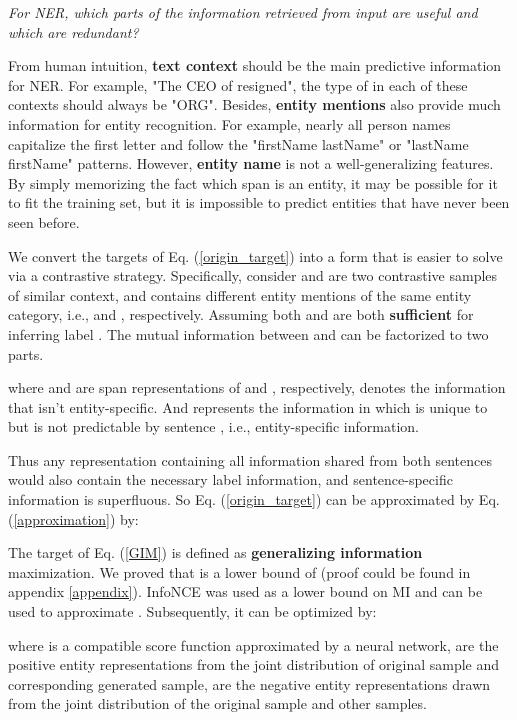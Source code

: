 \documentclass[11pt]{article}
\begin{document}
\textit{For NER, which parts of the information retrieved from input  are useful and which are redundant?}

From human intuition, \textbf{text context} should be the main predictive information for NER. For example, "The CEO of  resigned", the type of  in each of these contexts should always be "ORG". Besides, \textbf{entity mentions} also provide much information for entity recognition. For example, nearly all person names capitalize the first letter and follow the "firstName lastName" or "lastName firstName" patterns. 
However, \textbf{entity name} is not a well-generalizing features. By simply memorizing the fact which span is an entity, it may be possible for it to fit the training set, but it is impossible to predict entities that have never been seen before.



We convert the targets of Eq. (\ref{origin_target}) into a form that is easier to solve via a contrastive strategy. Specifically, consider  and  are two contrastive samples of similar context, and contains different entity mentions of the same entity category, i.e.,  and , respectively. Assuming both  and  are both \textbf{sufficient} for inferring label . The mutual information between  and  can be factorized to two parts.


where  and  are span representations of  and , respectively,  denotes the information that isn't entity-specific. And  represents the information in  which is unique to  but is not predictable by sentence , i.e., entity-specific information.

Thus any representation  containing all information shared from both sentences would also contain the necessary label information, and sentence-specific information is superfluous. So Eq. (\ref{origin_target}) can be approximated by Eq. (\ref{approximation}) by:



The target of Eq. (\ref{GIM}) is defined as \textbf{generalizing information} maximization. We proved that  is a lower bound of (proof could be found in appendix \ref{appendix}). InfoNCE \cite{oord2018representation} was used as a lower bound on MI and can be used to approximate . Subsequently, it can be  optimized by:

 

where  is a compatible score function approximated by a neural network,  are the positive entity representations from the joint distribution  of original sample and corresponding generated sample,  are the negative entity representations drawn from the joint distribution of the original sample and other samples.
\end{document}
